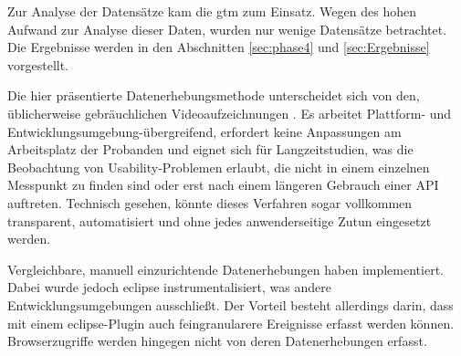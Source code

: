 Zur Analyse der Datensätze kam die \gls{gtm} zum Einsatz. Wegen des hohen Aufwand zur Analyse dieser Daten, wurden nur wenige Datensätze betrachtet. Die Ergebnisse werden in den Abschnitten \ref{sec:phase4} und \ref{sec:Ergebnisse} vorgestellt.

Die hier präsentierte Datenerhebungsmethode unterscheidet sich von den, üblicherweise gebräuchlichen Videoaufzeichnungen \citep[vgl.][]{clarke:2006,LaToza:2007fj,Grill:2012jm,Piccioni:2013uq}. Es arbeitet Plattform- und Entwicklungsumgebung-übergreifend, erfordert keine Anpassungen am Arbeitsplatz der Probanden und eignet sich für Langzeitstudien, was die Beobachtung von Usability-Problemen erlaubt, die nicht in einem einzelnen Messpunkt zu finden sind oder erst nach einem längeren Gebrauch einer API auftreten. Technisch gesehen, könnte dieses Verfahren sogar vollkommen transparent, automatisiert und ohne jedes anwenderseitige Zutun eingesetzt werden.

Vergleichbare, manuell einzurichtende Datenerhebungen haben \cite{LaToza:2007fj,Layman:2008:MIU:1370114.1370133} implementiert. Dabei wurde jedoch \gls{eclipse} instrumentalisiert, was andere Entwicklungsumgebungen ausschließt. Der Vorteil besteht allerdings darin, dass mit einem \gls{eclipse}-Plugin auch feingranularere Ereignisse erfasst werden können. Browserzugriffe werden hingegen nicht von deren Datenerhebungen erfasst.

